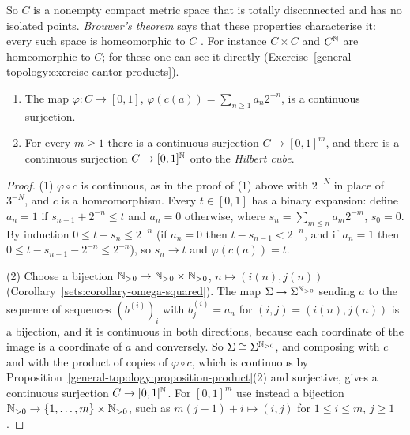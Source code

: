 So $C$ is a nonempty compact metric space that is totally disconnected and has no isolated points. \emph{Brouwer's theorem} says that these properties characterise it: every such space is homeomorphic
to $C$ \cite{kechris-1995}. For instance $C \times C$ and $C^{\mathbb{N}}$ are homeomorphic to $C$; for these one can see it directly (Exercise~\ref{general-topology:exercise-cantor-products}).

\begin{proposition}\label{general-topology:proposition-cantor-surjections}
\begin{enumerate}
\item The map $\varphi \colon C \to [0, 1]$, $\varphi(c(a)) = \sum_{n \geq 1}a_n2^{-n}$, is a continuous surjection.
\item For every $m \geq 1$ there is a continuous surjection $C \to [0, 1]^m$, and there is a continuous surjection $C \to [0, 1]^{\mathbb{N}}$ onto the \emph{Hilbert cube}.
\end{enumerate}
\end{proposition}

\begin{proof}
(1) $\varphi \circ c$ is continuous, as in the proof of (1) above with $2^{-N}$ in place of $3^{-N}$, and $c$ is a homeomorphism. Every $t \in [0, 1]$ has a binary expansion: define $a_n = 1$ if
$s_{n-1} + 2^{-n} \leq t$ and $a_n = 0$ otherwise, where $s_n = \sum_{m \leq n}a_m2^{-m}$, $s_0 = 0$. By induction $0 \leq t - s_n \leq 2^{-n}$ (if $a_n = 0$ then $t - s_{n-1} < 2^{-n}$, and if $a_n = 1$ then
$0 \leq t - s_{n-1} - 2^{-n} \leq 2^{-n}$), so $s_n \to t$ and $\varphi(c(a)) = t$.

(2) Choose a bijection $\mathbb{N}_{>0} \to \mathbb{N}_{>0} \times \mathbb{N}_{>0}$, $n \mapsto (i(n), j(n))$ (Corollary~\ref{sets:corollary-omega-squared}). The map $\Sigma \to \Sigma^{\mathbb{N}_{>0}}$ sending $a$ to the sequence of sequences
$(b^{(i)})_i$ with $b^{(i)}_j = a_n$ for $(i, j) = (i(n), j(n))$ is a bijection, and it is continuous in both directions, because each coordinate of the image is a coordinate of $a$ and conversely. So
$\Sigma \cong \Sigma^{\mathbb{N}_{>0}}$, and composing with $c$ and with the product of copies of $\varphi \circ c$, which is continuous by Proposition~\ref{general-topology:proposition-product}(2) and surjective,
gives a continuous surjection $C \to [0, 1]^{\mathbb{N}}$. For $[0, 1]^m$ use instead a bijection $\mathbb{N}_{>0} \to \{1, \ldots, m\} \times \mathbb{N}_{>0}$, such as $m(j - 1) + i \mapsto (i, j)$ for $1 \leq i \leq m$, $j \geq 1$.
\end{proof}

